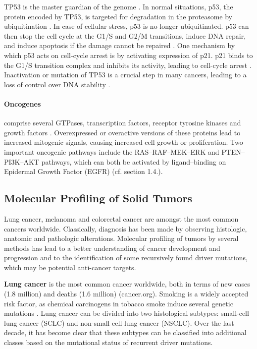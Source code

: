 {{{    TP53 is the master guardian of the genome {\cite{tp53_1}}. In normal
    situations, p53, the protein encoded by TP53, is targeted for degradation
    in the proteasome by ubiquitination {\cite{tp53_2}}. In case of cellular
    stress, p53 is no longer ubiquitinated. p53 can then stop the cell cycle at
    the G1/S and G2/M transitions, induce DNA repair, and induce apoptosis if
    the damage cannot be repaired {\cite{tp53_3}}. One mechanism by which p53
    acts on cell-cycle arrest is by activating expression of p21. p21 binds to
    the G1/S transition complex and inhibits its activity, leading to
    cell-cycle arrest {\cite{tp53_3}}. Inactivation or mutation of TP53 is a
    crucial step in many cancers, leading to a loss of control over DNA
    stability {\cite{tp53_4}}.

    \paragraph{Oncogenes} comprise several GTPases, transcription factors,
    receptor tyrosine kinases and growth factors {\cite{oncogenes}}.
    Overexpressed or overactive versions of these proteins lead to increased
    mitogenic signals, causing increased cell growth or proliferation. Two
    important oncogenic pathways include the RAS--RAF--MEK--ERK and
    PTEN--PI3K--AKT pathways, which can both be activated by ligand--binding on
    Epidermal Growth Factor (EGFR) (cf. section 1.4.).

  \subsection{Molecular Profiling of Solid Tumors}

    Lung cancer, melanoma and colorectal cancer are amongst the most common
    cancers worldwide. Classically, diagnosis has been made by observing
    histologic, anatomic and pathologic alterations. Molecular
    profiling of tumors by several methods has lead to a better understanding
    of cancer development and progression and to the identification of some
    recursively found driver mutations, which may be potential anti-cancer
    targets.

    \textbf{Lung cancer} is the most common cancer worldwide, both in terms of
    new cases (1.8 million) and deaths (1.6 million) (cancer.org). Smoking is a
    widely accepted risk factor, as chemical carcinogens in tobacco smoke
    induce several genetic mutations {\cite{smoking_cancer}}. Lung cancer can
    be divided into two histological subtypes: small-cell lung cancer (SCLC)
    and non-small cell lung cancer (NSCLC). Over the last decade, it has become
    clear that these subtypes can be classified into  additional classes based
    on the mutational status of recurrent driver mutations.

}}}

